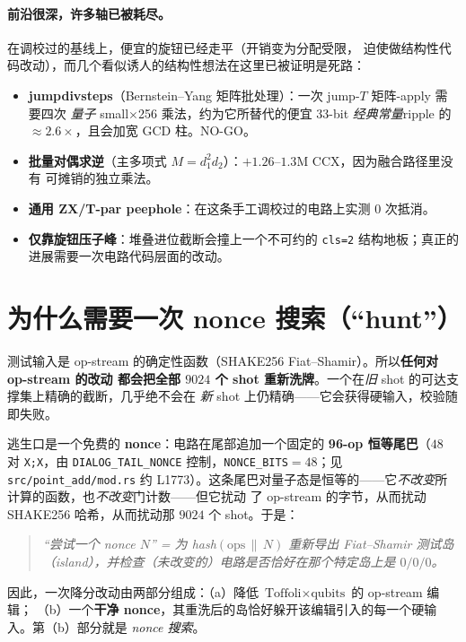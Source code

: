 \documentclass[11pt]{ctexart}
\let\c\lstinline
\begin{document}
\paragraph{前沿很深，许多轴已被耗尽。}在调校过的基线上，便宜的旋钮已经走平（开销变为分配受限，
迫使做结构性代码改动），而几个看似诱人的结构性想法在这里已被证明是死路：
\begin{itemize}[nosep]
  \item \textbf{jumpdivsteps}（Bernstein--Yang 矩阵批处理）：一次 jump-$T$ 矩阵-apply 需要四次
  \emph{量子} small$\times$256 乘法，约为它所替代的便宜 33-bit \emph{经典常量}ripple 的
  $\approx 2.6\times$，且会加宽 GCD 柱。NO-GO。
  \item \textbf{批量对偶求逆}（主多项式 $M=d_1^2 d_2$）：$+1.26$--$1.3$M CCX，因为融合路径里没有
  可摊销的独立乘法。
  \item \textbf{通用 ZX/T-par peephole}：在这条手工调校过的电路上实测 $0$ 次抵消。
  \item \textbf{仅靠旋钮压子峰}：堆叠进位截断会撞上一个不可约的 \texttt{cls=2} 结构地板；真正的
  进展需要一次电路代码层面的改动。
\end{itemize}

\section{为什么需要一次 nonce 搜索（``hunt''）}

测试输入是 op-stream 的确定性函数（SHAKE256 Fiat--Shamir）。所以\textbf{任何对 op-stream 的改动
都会把全部 $9024$ 个 shot 重新洗牌}。一个在\emph{旧} shot 的可达支撑集上精确的截断，几乎绝不会在
\emph{新} shot 上仍精确——它会获得硬输入，校验随即失败。

逃生口是一个免费的 \textbf{nonce}：电路在尾部追加一个固定的 \textbf{96-op 恒等尾巴}（$48$ 对
\c{X;X}，由 \c{DIALOG_TAIL_NONCE} 控制，\c{NONCE_BITS}$=48$；见 \c{src/point_add/mod.rs} 约
L1773）。这条尾巴对量子态是恒等的——它\emph{不改变}所计算的函数，也\emph{不改变}门计数——但它扰动
了 op-stream 的字节，从而扰动 SHAKE256 哈希，从而扰动那 $9024$ 个 shot。于是：
\begin{quote}\itshape
``尝试一个 nonce $N$'' = 为 hash$(\text{ops}\,\|\,N)$ 重新导出 Fiat--Shamir 测试岛
（island），并检查（未改变的）电路是否恰好在\emph{那个特定}岛上是 $0/0/0$。
\end{quote}
因此，一次降分改动由两部分组成：（a）降低 $\text{Toffoli}\times\text{qubits}$ 的 op-stream 编辑；
（b）一个\textbf{干净 nonce}，其重洗后的岛恰好躲开该编辑引入的每一个硬输入。第（b）部分就是
\emph{nonce 搜索}。
\end{document}
